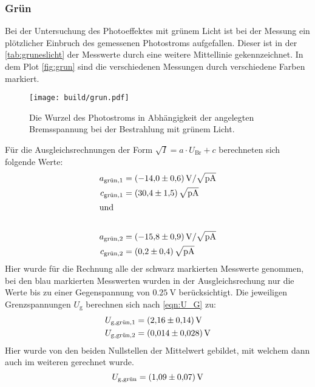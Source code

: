 \subsubsection{Grün}
Bei der Untersuchung des Photoeffektes mit grünem Licht ist bei der Messung ein plötzlicher Einbruch des gemessenen Photostroms aufgefallen.
Dieser ist in der \autoref{tab:gruneslicht} der Messwerte durch eine weitere Mittellinie gekennzeichnet.
In dem Plot \autoref{fig:grun} sind die verschiedenen Messungen durch verschiedene Farben markiert.
\begin{figure}[H]
  \centering
  \texttt{[image: build/grun.pdf]}
  \caption{Die Wurzel des Photostroms in Abhängigkeit der angelegten Bremsspannung bei der Bestrahlung mit grünem Licht.}
  \label{fig:grun}
\end{figure}
\noindent
Für die Ausgleichsrechnungen der Form $\sqrt{I} = a \cdot U_{\text{Br}} + c $ berechneten sich folgende Werte:
\begin{align*}
  a_{\text{grün},1} &= \SI{-14.0 \pm 0.6}{\volt\per\sqrt{\pico\ampere}}\\
  c_{\text{grün},1} &= \SI{30.4 \pm 1.5}{\sqrt{\pico\ampere}}\\
  \intertext{und}\\
  a_{\text{grün},2} &= \SI{-15.8 \pm 0.9}{\volt\per\sqrt{\pico\ampere}}\\
  c_{\text{grün},2} &= \SI{0.2 \pm 0.4}{\sqrt{\pico\ampere}}
\end{align*}
Hier wurde für die Rechnung alle der schwarz markierten Messwerte genommen, bei den blau markierten Messwerten wurden in der Ausgleichsrechung nur die Werte bis zu einer Gegenspannung von $\SI{0.25}{\volt}$ berücksichtigt.
Die jeweiligen Grenzspannungen $U_{\text{g}}$ berechnen sich nach \eqref{eqn:U_G} zu:
\begin{align*}
  U_{\text{g},\text{grün},1} &= \SI{2.16 \pm 0.14}{\volt}\\
  U_{\text{g},\text{grün},2} &= \SI{0.014 \pm 0.028}{\volt}\\
\end{align*}
Hier wurde von den beiden Nullstellen der Mittelwert gebildet, mit welchem dann auch im weiteren gerechnet wurde.
\begin{equation*}
  U_{\text{g},\text{grün}} = \SI{1.09 \pm 0.07}{\volt}
\end{equation*}

